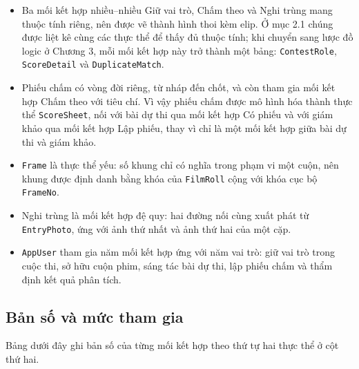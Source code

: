 \begin{itemize}
    \item Ba mối kết hợp nhiều--nhiều Giữ vai trò, Chấm theo và Nghi trùng mang thuộc tính riêng, nên được vẽ thành hình thoi kèm elip. Ở mục 2.1 chúng được liệt kê cùng các thực thể để thấy đủ thuộc tính; khi chuyển sang lược đồ logic ở Chương 3, mỗi mối kết hợp này trở thành một bảng: \texttt{ContestRole}, \texttt{ScoreDetail} và \texttt{DuplicateMatch}.
    \item Phiếu chấm có vòng đời riêng, từ nháp đến chốt, và còn tham gia mối kết hợp Chấm theo với tiêu chí. Vì vậy phiếu chấm được mô hình hóa thành thực thể \texttt{ScoreSheet}, nối với bài dự thi qua mối kết hợp Có phiếu và với giám khảo qua mối kết hợp Lập phiếu, thay vì chỉ là một mối kết hợp giữa bài dự thi và giám khảo.
    \item \texttt{Frame} là thực thể yếu: số khung chỉ có nghĩa trong phạm vi một cuộn, nên khung được định danh bằng khóa của \texttt{FilmRoll} cộng với khóa cục bộ \texttt{FrameNo}.
    \item Nghi trùng là mối kết hợp đệ quy: hai đường nối cùng xuất phát từ \texttt{EntryPhoto}, ứng với ảnh thứ nhất và ảnh thứ hai của một cặp.
    \item \texttt{AppUser} tham gia năm mối kết hợp ứng với năm vai trò: giữ vai trò trong cuộc thi, sở hữu cuộn phim, sáng tác bài dự thi, lập phiếu chấm và thẩm định kết quả phân tích.
\end{itemize}

\subsection{Bản số và mức tham gia}

Bảng dưới đây ghi bản số của từng mối kết hợp theo thứ tự hai thực thể ở cột thứ hai.

